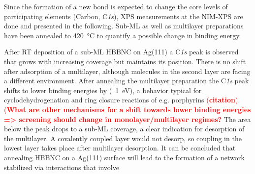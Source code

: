 %

Since the formation of a new bond is expected to change the core levels of participating elements (Carbon, C\textit{1s}), XPS measurements at the NIM-XPS are done and presented in the following. Sub-ML as well as multilayer preparations have been annealed to \SI{420}{\celsius} to quantify a possible change in binding energy. 

After RT deposition of a sub-ML HBBNC on Ag(111) a C\textit{1s} peak is observed that grows with increasing coverage but maintains its position. There is no shift after adsorption of a multilayer, although molecules in the second layer are facing a different environment.
After annealing the multilayer preparation the C\textit{1s} peak shifts to lower binding energies by (~\SI{1}{\eV}), a behavior typical for cyclodehydrogenation and ring closure reactions of e.g. porphyrins \textcolor{red}{(\textbf{citation})}. \textcolor{red}{(\textbf{What are other mechanisms for a shift towards lower binding energies => screening should change in monolayer/multilayer regimes?}} The area below the peak drops to a sub-ML coverage, a clear indication for desorption of the multilayer. A covalently coupled layer would not desorp, so coupling in the lowest layer takes place after multilayer desorption.
It can be concluded that annealing HBBNC on a Ag(111) surface will lead to the formation of a network stabilized via interactions that involve 

